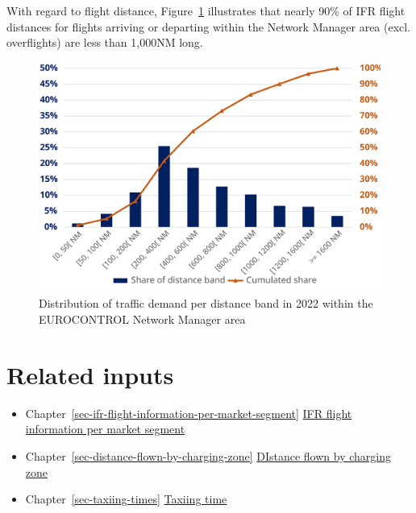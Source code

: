 \documentclass[
  11pt,
  a4paper,
]{book}
\providecommand{\tightlist}{%
  \setlength{\itemsep}{0pt}\setlength{\parskip}{0pt}}\usepackage{longtable,booktabs,array}
\begin{document}
With regard to flight distance,
Figure~\ref{fig-traffic-demand-distribution} illustrates that nearly
90\% of IFR flight distances for flights arriving or departing within
the Network Manager area (excl. overflights) are less than 1,000NM long.

\begin{figure}

{\centering \includegraphics{./figures/traffic_demand_distribution.svg}

}

\caption{\label{fig-traffic-demand-distribution}Distribution of traffic
demand per distance band in 2022 within the EUROCONTROL Network Manager
area}

\end{figure}

\hypertarget{related-inputs-10}{%
\section{Related inputs}\label{related-inputs-10}}

\begin{itemize}
\tightlist
\item
  Chapter~\ref{sec-ifr-flight-information-per-market-segment}
  \protect\hyperlink{sec-ifr-flight-information-per-market-segment}{IFR
  flight information per market segment}
\item
  Chapter~\ref{sec-distance-flown-by-charging-zone}
  \protect\hyperlink{sec-distance-flown-by-charging-zone}{DIstance flown
  by charging zone}
\item
  Chapter~\ref{sec-taxiing-times}
  \protect\hyperlink{sec-taxiing-time}{Taxiing time}
\end{itemize}
\end{document}
